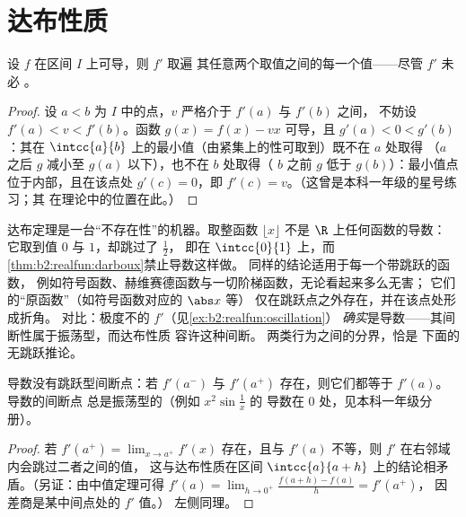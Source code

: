 \section{达布性质}

\begin{theorem}[达布]\label{thm:b2:realfun:darboux}
设 $f$ 在区间 $I$ 上可导，则 $f'$ 取遍
其任意两个取值之间的每一个值——尽管 $f'$ 未必
。
\end{theorem}

\begin{proof}
设 $a < b$ 为 $I$ 中的点，$v$ 严格介于 $f'(a)$ 与 $f'(b)$ 之间，
不妨设 $f'(a) < v < f'(b)$。函数 $g(x) = f(x) - vx$
可导，且 $g'(a) < 0 < g'(b)$：其在
$\intcc{a}{b}$ 上的最小值（由紧集上的性可取到）既不在 $a$ 处取得
（$a$ 之后 $g$ 减小至 $g(a)$ 以下），也不在 $b$ 处取得（
$b$ 之前 $g$ 低于 $g(b)$）：最小值点位于内部，且在该点处 $g'(c)
= 0$，即 $f'(c) = v$。（这曾是本科一年级的星号练习；其
在理论中的位置在此。）
\end{proof}

\begin{example}[哪些函数是导数？]\label{ex:b2:realfun:whichderivatives}
达布定理是一台“不存在性”的机器。取整函数
$\lfloor x\rfloor$ 不是 $\R$ 上任何函数的导数：
它取到值 $0$ 与 $1$，却跳过了 $\frac12$，
即在 $\intcc{0}{1}$ 上，而\cref{thm:b2:realfun:darboux}禁止导数这样做。
同样的结论适用于每一个带跳跃的函数，
例如符号函数、赫维赛德函数与一切阶梯函数，无论看起来多么无害；
它们的“原函数”（如符号函数对应的 $\abs x$ 等）
仅在跳跃点之外存在，并在该点处形成折角。
对比：极度不的 $f'$（见\cref{ex:b2:realfun:oscillation}）
\emph{确实}是导数——其间断性属于振荡型，而达布性质
容许这种间断。
两类行为之间的分界，恰是
下面的无跳跃推论。
\end{example}

\begin{corollary}\label{cor:b2:realfun:nojumps}
导数没有跳跃型间断点：若 $f'(a^-)$ 与
$f'(a^+)$ 存在，则它们都等于 $f'(a)$。导数的间断点
总是振荡型的（例如 $x^2\sin\frac1x$ 的
导数在 $0$ 处，见本科一年级分册）。
\end{corollary}

\begin{proof}
若 $f'(a^+) = \lim_{x\to a^+} f'(x)$ 存在，且与
$f'(a)$ 不等，则 $f'$ 在右邻域内会跳过二者之间的值，
这与达布性质在区间
$\intcc{a}{a + h}$ 上的结论相矛盾。（另证：由中值定理可得
$f'(a) = \lim_{h\to0^+} \frac{f(a+h)-f(a)}{h} = f'(a^+)$，
因差商是某中间点处的 $f'$ 值。）
左侧同理。
\end{proof}

